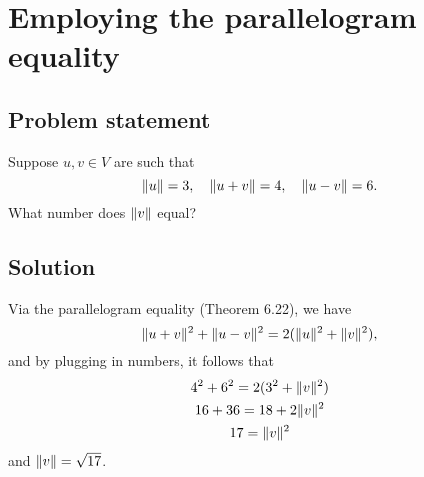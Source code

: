 \documentclass{article}
\begin{document}
\clearpage

\section{Employing the parallelogram equality}
\subsection*{Problem statement}
Suppose $u,v\in V$ are such that 
\[\lVert u\rVert=3,\quad \lVert u+v\rVert=4,\quad \lVert u-v\rVert=6.\]
What number does $\lVert v\rVert$ equal?

\subsection*{Solution}
Via the parallelogram equality (Theorem 6.22), we have
\[\lVert u+v\rVert^2+\lVert u-v\rVert^2=2(\lVert u\rVert^2+\lVert v\rVert^2),\]
and by plugging in numbers, it follows that
\begin{gather*}
    4^2+6^2=2(3^2+\lVert v\rVert^2)\\
    16+36=18+2\lVert v\rVert^2\\
    17=\lVert v\rVert^2
\end{gather*}
and $\lVert v\rVert=\sqrt{17}$.
\end{document}
